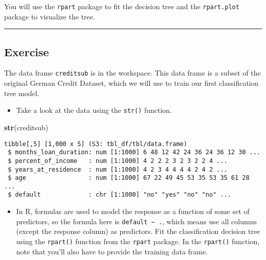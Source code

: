 \documentclass[
]{book}
\newenvironment{Shaded}{\begin{snugshade}}{\end{snugshade}}
\newcommand{\KeywordTok}[1]{\textcolor[rgb]{0.13,0.29,0.53}{\textbf{#1}}}
\newcommand{\NormalTok}[1]{#1}
\providecommand{\tightlist}{%
  \setlength{\itemsep}{0pt}\setlength{\parskip}{0pt}}
\begin{document}
You will use the \texttt{rpart} package to fit the decision tree and the \texttt{rpart.plot} package to visualize the tree.

\begin{center}\rule{0.5\linewidth}{0.5pt}\end{center}

\hypertarget{exercise}{%
\subsection*{Exercise}\label{exercise}}

The data frame \texttt{creditsub} is in the workspace. This data frame is a subset of the original German Credit Dataset, which we will use to train our first classification tree model.

\begin{itemize}
\tightlist
\item
  Take a look at the data using the \texttt{str()} function.
\end{itemize}

\begin{Shaded}
\begin{Highlighting}[]
\KeywordTok{str}\NormalTok{(creditsub)}
\end{Highlighting}
\end{Shaded}

\begin{verbatim}
tibble[,5] [1,000 x 5] (S3: tbl_df/tbl/data.frame)
 $ months_loan_duration: num [1:1000] 6 48 12 42 24 36 24 36 12 30 ...
 $ percent_of_income   : num [1:1000] 4 2 2 2 3 2 3 2 2 4 ...
 $ years_at_residence  : num [1:1000] 4 2 3 4 4 4 4 2 4 2 ...
 $ age                 : num [1:1000] 67 22 49 45 53 35 53 35 61 28 ...
 $ default             : chr [1:1000] "no" "yes" "no" "no" ...
\end{verbatim}

\begin{itemize}
\tightlist
\item
  In R, formulas are used to model the response as a function of some set of predictors, so the formula here is \texttt{default\ \textasciitilde{}\ .}, which means use all columns (except the response column) as predictors. Fit the classification decision tree using the \texttt{rpart()} function from the \texttt{rpart} package. In the \texttt{rpart()} function, note that you'll also have to provide the training data frame.
\end{itemize}
\end{document}
